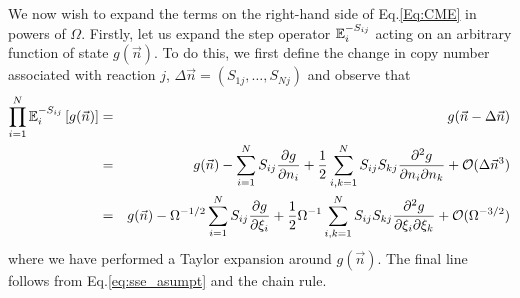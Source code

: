 \documentclass[10pt,letterpaper]{article}
\begin{document}
We now wish to expand the terms on the right-hand side of Eq.\eqref{Eq:CME} in powers of $\Omega$. Firstly, let us expand the step operator $\mathbb{E}_i^{-S_{ij}}$ acting on an arbitrary function of state $g(\vec{n})$. To do this, we first define the change in copy number associated with reaction $j$, $\Delta\vec{n}=(S_{1j},\dots,S_{Nj})$ and observe that
\begin{eqnarray}
\prod_{i=1}^N\mathbb{E}_i^{-S_{ij}}\left[g(\vec{n})\right] &=& g(\vec{n}-\Delta\vec{n}) \nonumber \\
&=& g(\vec{n}) - \sum_{i=1}^NS_{ij}\frac{\partial g}{\partial n_i} + \frac{1}{2}\sum_{i,k=1}^N S_{ij}S_{kj} \frac{\partial^2g}{\partial n_i\partial n_k} + \mathcal{O}(\Delta\vec{n}^3) \nonumber \\
&=& g(\vec{n}) - \Omega^{-1/2}\sum_{i=1}^NS_{ij}\frac{\partial g}{\partial\xi_i} + \frac{1}{2}\Omega^{-1}\sum_{i,k=1}^N S_{ij}S_{kj} \frac{\partial^2g}{\partial\xi_i\partial\xi_k} + \mathcal{O}(\Omega^{-3/2}) \label{eq:exp_step} 
\end{eqnarray}
where we have performed a Taylor expansion around $g(\vec{n})$. The final line follows from Eq.\eqref{eq:sse_asumpt} and the chain rule.
\end{document}
